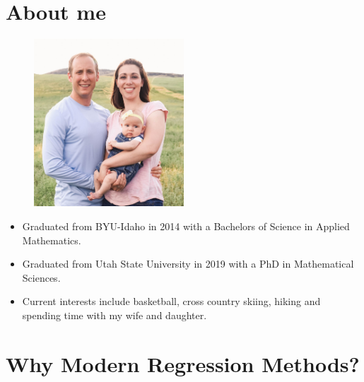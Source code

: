 \documentclass[12pt]{../notes}
\begin{document}

\section{About me}

\begin{figure}[H]
\centering
\includegraphics[width=0.5\textwidth]{../figures/module1/family.jpg}
\end{figure}

\begin{itemize}
\item Graduated from BYU-Idaho in 2014 with a Bachelors of Science in Applied Mathematics.
\item Graduated from Utah State University in 2019 with a PhD in Mathematical Sciences.
\item Current interests include basketball, cross country skiing, hiking and spending time with my wife and daughter.
\end{itemize}



\begin{minipage}[l][2cm][c]{\textwidth}

\end{minipage}

\section{Why Modern Regression Methods?}
\end{document}
